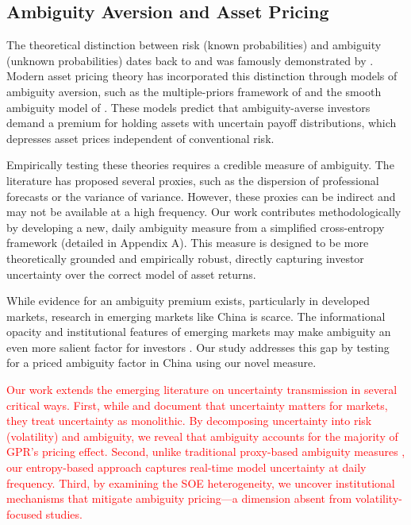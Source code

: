 \documentclass[preprint,12pt,authoryear]{elsarticle}
\begin{document}
\subsection{Ambiguity Aversion and Asset Pricing}

The theoretical distinction between risk (known probabilities) and ambiguity (unknown probabilities) dates back to \citet{Knight1921} and was famously demonstrated by \citet{Ellsberg1961}. Modern asset pricing theory has incorporated this distinction through models of ambiguity aversion, such as the multiple-priors framework of \citet{Gilboa1989} and the smooth ambiguity model of \citet{Klibanoff2005}. These models predict that ambiguity-averse investors demand a premium for holding assets with uncertain payoff distributions, which depresses asset prices independent of conventional risk.

Empirically testing these theories requires a credible measure of ambiguity. The literature has proposed several proxies, such as the dispersion of professional forecasts \citep{Brenner2018, Ulrich2013} or the variance of variance. However, these proxies can be indirect and may not be available at a high frequency. Our work contributes methodologically by developing a new, daily ambiguity measure from a simplified cross-entropy framework (detailed in Appendix A). This measure is designed to be more theoretically grounded and empirically robust, directly capturing investor uncertainty over the correct model of asset returns.

While evidence for an ambiguity premium exists, particularly in developed markets, research in emerging markets like China is scarce. The informational opacity and institutional features of emerging markets may make ambiguity an even more salient factor for investors \citep{Easley2009}. Our study addresses this gap by testing for a priced ambiguity factor in China using our novel measure.

\textcolor{red}{Our work extends the emerging literature on uncertainty transmission in several critical ways. First, while \citet{Baker2016} and \citet{Caldara2022} document that uncertainty matters for markets, they treat uncertainty as monolithic. By decomposing uncertainty into risk (volatility) and ambiguity, we reveal that ambiguity accounts for the majority of GPR's pricing effect. Second, unlike traditional proxy-based ambiguity measures \citep{Brenner2018}, our entropy-based approach captures real-time model uncertainty at daily frequency. Third, by examining the SOE heterogeneity, we uncover institutional mechanisms that mitigate ambiguity pricing---a dimension absent from volatility-focused studies.}
\end{document}
